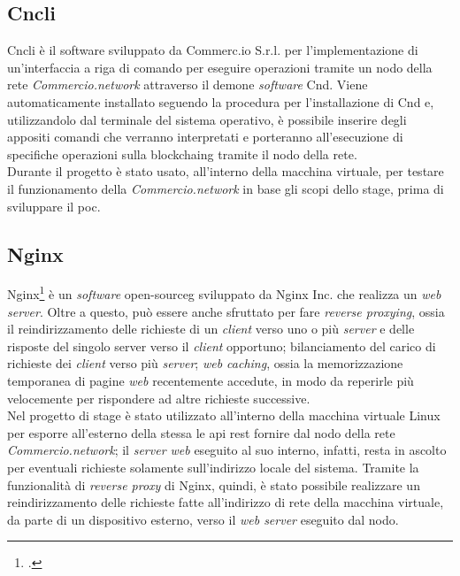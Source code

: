 \subsection*{Cncli}

Cncli è il software sviluppato da Commerc.io S.r.l. per l'implementazione di un'interfaccia a riga di comando per eseguire operazioni tramite un nodo della rete \textit{Commercio.network} attraverso il demone \textit{software} Cnd. Viene automaticamente installato seguendo la procedura per l'installazione di Cnd e, utilizzandolo dal terminale del sistema operativo, è possibile inserire degli appositi comandi che verranno interpretati e porteranno all'esecuzione di specifiche operazioni sulla \gls{blockchaing} tramite il nodo della rete.\\
Durante il progetto è stato usato, all'interno della macchina virtuale, per testare il funzionamento della \textit{Commercio.network} in base gli scopi dello stage, prima di sviluppare il \gls{poc}. 

\subsection*{Nginx}

Nginx\footcite{site:nginx} è un \textit{software} \gls{open-sourceg} sviluppato da Nginx Inc. che realizza un \textit{web server}. Oltre a questo, può essere anche sfruttato per fare \textit{reverse proxying}, ossia il reindirizzamento delle richieste di un \textit{client} verso uno o più \textit{server} e delle risposte del singolo server verso il \textit{client} opportuno; bilanciamento del carico di richieste dei \textit{client} verso più \textit{server}; \textit{web caching}, ossia la memorizzazione temporanea di pagine \textit{web} recentemente accedute, in modo da reperirle più velocemente per rispondere ad altre richieste successive.\\
Nel progetto di stage è stato utilizzato all'interno della macchina virtuale Linux per esporre all'esterno della stessa le \gls{api} \gls{rest} fornire dal nodo della rete \textit{Commercio.network}; il \textit{server web} eseguito al suo interno, infatti, resta in ascolto per eventuali richieste solamente sull'indirizzo locale del sistema. Tramite la funzionalità di \textit{reverse proxy} di Nginx, quindi, è stato possibile realizzare un reindirizzamento delle richieste fatte all'indirizzo di rete della macchina virtuale, da parte di un dispositivo esterno, verso il \textit{web server} eseguito dal nodo.

